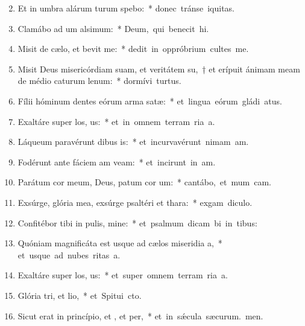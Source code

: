 \begin{flushleft}
\begin{enumerate}[leftmargin=*]
\setcounter{enumi}{1}

\item Et in umbra alárum turum spebo:~* \mbox{donec tránse iquitas.}
\item Clamábo ad um alsimum:~* \mbox{Deum, qui benecit hi.}
\item Misit de cælo, et bevit me:~* \mbox{dedit in oppróbrium cultes me.}
\item Misit Deus misericórdiam suam, et veritátem su,~† et erípuit ánimam meam de médio caturum lenum:~* \mbox{dormívi turtus.}
\item Fílii hóminum dentes eórum arma  satæ:~* \mbox{et lingua eórum gládi atus.}
\item Exaltáre super los, us:~* \mbox{et in omnem terram ria a.}
\item Láqueum paravérunt dibus is:~* \mbox{et incurvavérunt nimam am.}
\item Fodérunt ante fáciem am veam:~* \mbox{et incirunt in am.}
\item Parátum cor meum, Deus, patum cor um:~* \mbox{cantábo, et mum cam.}
\item Exsúrge, glória mea, exsúrge psaltéri et thara:~* \mbox{exgam diculo.}
\item Confitébor tibi in pulis, mine:~* \mbox{et psalmum dicam bi in tibus:}
\item Quóniam magnificáta est usque ad cælos miseridia a,~* \mbox{et usque ad nubes ritas a.}
\item Exaltáre super los, us:~* \mbox{et super omnem terram ria a.}
\item Glória tri, et lio,~* \mbox{et Spitui cto.}
\item Sicut erat in princípio, et , et per,~* \mbox{et in s\'{\ae}cula sæcurum. men.}

\end{enumerate}
\end{flushleft}

